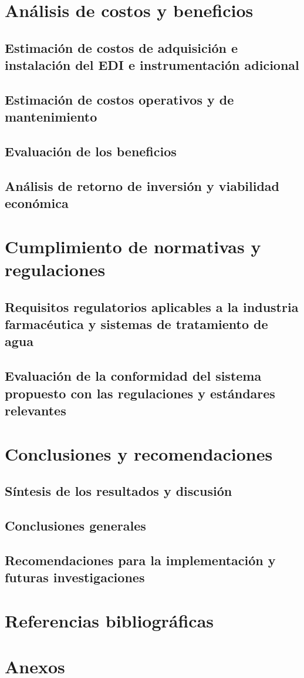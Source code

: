 \documentclass[
	spanish, %
	letterpaper, oneside
]{book}
\begin{document}
\chapter{Análisis de costos y beneficios}
\section{Estimación de costos de adquisición e instalación del EDI e instrumentación adicional}
\section{Estimación de costos operativos y de mantenimiento}
\section{Evaluación de los beneficios}
\section{Análisis de retorno de inversión y viabilidad económica}

\chapter{Cumplimiento de normativas y regulaciones}
\section{Requisitos regulatorios aplicables a la industria farmacéutica y sistemas de tratamiento de agua}
\section{ Evaluación de la conformidad del sistema propuesto con las regulaciones y estándares relevantes}

\chapter{Conclusiones y recomendaciones}
\section*{Síntesis de los resultados y discusión}
\section*{Conclusiones generales}
\section*{Recomendaciones para la implementación y futuras investigaciones}

\chapter{Referencias bibliográficas}
\chapter{Anexos}


\end{document}
